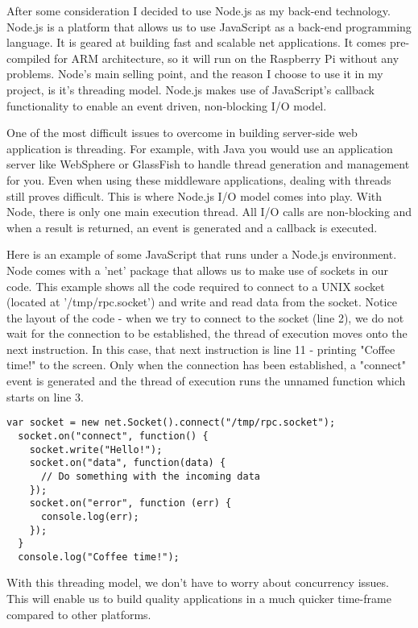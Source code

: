 After some consideration I decided to use Node.js as my back-end technology. Node.js is a platform that allows us to use JavaScript as a back-end programming language. It is geared at building fast and scalable net applications. It comes pre-compiled for ARM architecture, so it will run on the Raspberry Pi without any problems. Node's main selling point, and the reason I choose to use it in my project, is it's threading model. Node.js makes use of JavaScript's callback functionality to enable an event driven, non-blocking I/O model. 

One of the most difficult issues to overcome in building server-side web application is threading. For example, with Java you would use an application server like WebSphere or GlassFish to handle thread generation and management for you. Even when using these middleware applications, dealing with threads still proves difficult. This is where Node.js I/O model comes into play. With Node, there is only one main execution thread. All I/O calls are non-blocking and when a result is returned, an event is generated and a callback is executed.

Here is an example of some JavaScript that runs under a Node.js environment. Node comes with a 'net' package that allows us to make use of sockets in our code. This example shows all the code required to connect to a UNIX socket (located at '/tmp/rpc.socket') and write and read data from the socket. Notice the layout of the code - when we try to connect to the socket (line 2), we do not wait for the connection to be established, the thread of execution moves onto the next instruction. In this case, that next instruction is line 11 - printing "Coffee time!" to the screen. Only when the connection has been established, a "connect" event is generated and the thread of execution runs the unnamed function which starts on line 3. 

\vspace{20px}
\begin{lstlisting}[caption=Node.js and event driven I/O]
  var socket = new net.Socket().connect("/tmp/rpc.socket");
  socket.on("connect", function() {
    socket.write("Hello!");  
    socket.on("data", function(data) {
      // Do something with the incoming data
    });  
    socket.on("error", function (err) {
      console.log(err);
    });
  }
  console.log("Coffee time!");
\end{lstlisting}


With this threading model, we don't have to worry about concurrency issues. This will enable us to build quality applications in a much quicker time-frame compared to other platforms.

